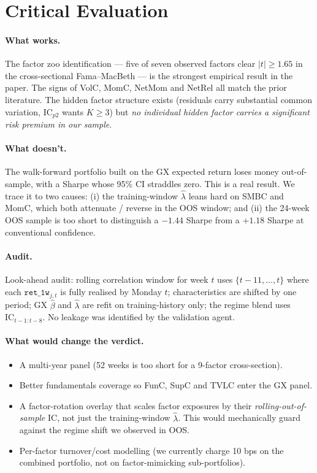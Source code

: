\documentclass[11pt,a4paper]{article}
\begin{document}
\section{Critical Evaluation}\label{sec:critique}

\paragraph{What works.} The factor zoo identification --- five of seven observed factors clear $|t|\ge 1.65$ in the cross-sectional Fama--MacBeth --- is the strongest empirical result in the paper. The signs of VolC, MomC, NetMom and NetRel all match the prior literature. The hidden factor structure exists (residuals carry substantial common variation, IC$_{p2}$ wants $K\ge 3$) but \emph{no individual hidden factor carries a significant risk premium in our sample}.

\paragraph{What doesn't.} The walk-forward portfolio built on the GX expected return loses money out-of-sample, with a Sharpe whose 95\% CI straddles zero. This is a real result. We trace it to two causes: (i) the training-window $\hat\lambda$ leans hard on SMBC and MomC, which both attenuate / reverse in the OOS window; and (ii) the 24-week OOS sample is too short to distinguish a $-1.44$ Sharpe from a $+1.18$ Sharpe at conventional confidence.

\paragraph{Audit.} Look-ahead audit: rolling correlation window for week $t$ uses $\{t-11,\dots,t\}$ where each $\texttt{ret\_1w}_{j,t}$ is fully realised by Monday $t$; characteristics are shifted by one period; GX $\hat\beta$ and $\hat\lambda$ are refit on training-history only; the regime blend uses $\text{IC}_{t-1:t-8}$. No leakage was identified by the validation agent.

\paragraph{What would change the verdict.}
\begin{itemize}[topsep=2pt,itemsep=0pt]
\item A multi-year panel (52 weeks is too short for a 9-factor cross-section).
\item Better fundamentals coverage so FunC, SupC and TVLC enter the GX panel.
\item A factor-rotation overlay that scales factor exposures by their \emph{rolling-out-of-sample} IC, not just the training-window $\hat\lambda$. This would mechanically guard against the regime shift we observed in OOS.
\item Per-factor turnover/cost modelling (we currently charge 10 bps on the combined portfolio, not on factor-mimicking sub-portfolios).
\end{itemize}
\end{document}
